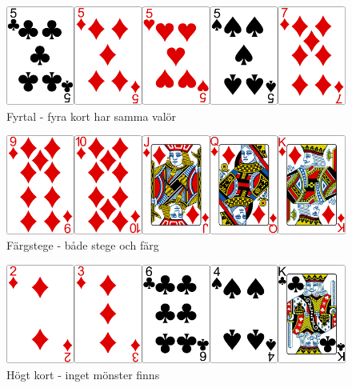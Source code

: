\begin{figure}[H]
 \begin{minipage}[c]{0.5\textwidth}
  \includegraphics[width=\textwidth]{../img/w05-hands/fours.png}
 \end{minipage}
 \begin{minipage}[c]{0.3\textwidth}
  \caption{Fyrtal - fyra kort har samma valör}
 \end{minipage}
\end{figure}

\begin{figure}[H]
 \begin{minipage}[c]{0.5\textwidth}
  \includegraphics[width=\textwidth]{../img/w05-hands/straightflush.png}
 \end{minipage}
 \begin{minipage}[c]{0.3\textwidth}
  \caption{Färgstege - både stege och färg}
 \end{minipage}
\end{figure}

\begin{figure}[H]
 \begin{minipage}[c]{0.5\textwidth}
  \includegraphics[width=\textwidth]{../img/w05-hands/none.png}
 \end{minipage}
 \begin{minipage}[c]{0.3\textwidth}
  \caption{Högt kort - inget mönster finns}
 \label{lab:shuffle:last-picture}
  \end{minipage}
\end{figure}
